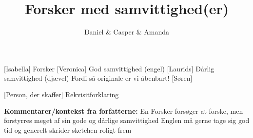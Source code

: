 \documentclass[a4paper,11pt]{article}
\title{Forsker med samvittighed(er)}
\author{Daniel \& Casper \& Amanda}
\begin{document}
\maketitle

\begin{roles}
    [Isabella] Forsker
    [Veronica] God samvittighed (engel)
    [Laurids] Dårlig samvittighed (djævel) Fordi så originale er vi åbenbart!
    [Søren]
\end{roles}

\begin{props}
    [Person, der skaffer] Rekvisitforklaring
\end{props}

\textbf{Kommentarer/kontekst fra forfatterne:}
En Forsker forsøger at forske, men forstyrres meget af sin gode og dårlige samvittighed
Englen må gerne tage sig god tid og generelt skrider sketchen roligt frem 
\end{document}
